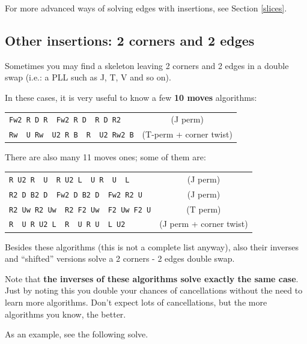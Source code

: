 \documentclass[11pt,a4paper]{book}
\newcommand{\p}{\textquotesingle}
\newcommand{\m}{\texttt}
\newcommand{\ps}{\p\,\,}
\begin{document}
For more advanced ways of solving edges with insertions, see Section \ref{slices}.

\subsection{Other insertions: 2 corners and 2 edges}

Sometimes you may find a skeleton leaving 2 corners and 2 edges in a double swap (i.e.: a PLL such as J, T, V and so on).

In these cases, it is very useful to know a few \textbf{10 moves} algorithms:
\begin{center}
\begin{tabular}{lc}
\m{Fw2 R D R\ps Fw2 R D\ps R D R2} & (J perm)\\
\m{Rw\ps U Rw\ps U2 R B\ps R\ps U2 Rw2 B\p} & (T-perm + corner twist)
\end{tabular}
\end{center}
There are also many 11 moves ones; some of them are:
\begin{center}
\begin{tabular}{lc}
\m{R U2 R\ps U\ps R U2 L\ps U R\ps U\ps L} & (J perm)\\
\m{R2 D B2 D\ps Fw2 D B2 D\ps Fw2 R2 U\p} & (J perm)\\
\m{R2 Uw R2 Uw\ps R2 F2 Uw\ps F2 Uw F2 U\p} & (T perm)\\
\m{R\ps U R U2 L\ps R\ps U R U\ps L U2} & (J perm + corner twist)
\end{tabular}
\end{center}
Besides these algorithms (this is not a complete list anyway), also their inverses and ``shifted'' versions solve a 2 corners - 2 edges double swap.

Note that \textbf{the inverses of these algorithms solve exactly the same case}. Just by noting this you double your chances of cancellations without the need to learn more algorithms.
Don't expect lots of cancellations, but the more algorithms you know, the better.

As an example, see the following solve.
\end{document}
